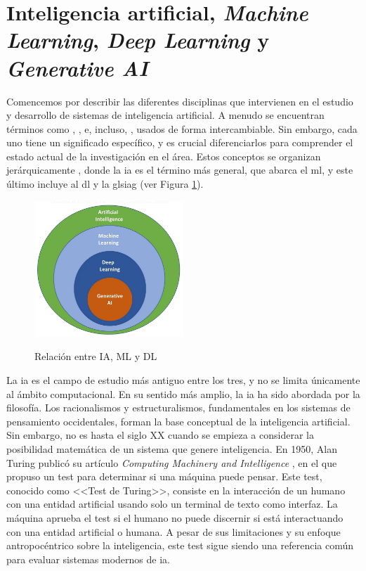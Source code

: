 
\section{Inteligencia artificial, \textit{Machine Learning}, \textit{Deep Learning} y \textit{Generative AI}}

Comencemos por describir las diferentes disciplinas que intervienen en el estudio y desarrollo de sistemas de inteligencia artificial. A menudo se encuentran términos como , ,  e, incluso, , usados de forma intercambiable. Sin embargo, cada uno tiene un significado específico, y es crucial diferenciarlos para comprender el estado actual de la investigación en el área. Estos conceptos se organizan jerárquicamente \citep{torresivinalsPythonDeepLearning2020}, donde la  \gls{ia} es el término más general, que abarca el \gls{ml}, y este último incluye al \gls{dl} y la gls{iag} (ver Figura \ref{fig:ai_ml_dl_gai}).

\begin{figure}[H]
    \caption[Relación entre IA, ML, DL y IAG]{Relación entre IA, ML y DL}
    \centering
    \includegraphics[width=0.5\textwidth]{./figuras/ai_ml_dl_gai.png}
    \label{fig:ai_ml_dl_gai}
\end{figure}

La \gls{ia} es el campo de estudio más antiguo entre los tres, y no se limita únicamente al ámbito computacional. En su sentido más amplio, la \gls{ia} ha sido abordada por la filosofía. Los racionalismos y estructuralismos, fundamentales en los sistemas de pensamiento occidentales, forman la base conceptual de la inteligencia artificial. Sin embargo, no es hasta el siglo XX cuando se empieza a considerar la posibilidad matemática de un sistema que genere inteligencia. En 1950, Alan Turing publicó su artículo \textit{Computing Machinery and Intelligence} \citep{alan1950a}, en el que propuso un test para determinar si una máquina puede pensar. Este test, conocido como <<Test de Turing>>, consiste en la interacción de un humano con una entidad artificial usando solo un terminal de texto como interfaz. La máquina aprueba el test si el humano no puede discernir si está interactuando con una entidad artificial o humana. A pesar de sus limitaciones y su enfoque antropocéntrico sobre la inteligencia, este test sigue siendo una referencia común para evaluar sistemas modernos de \gls{ia}.

